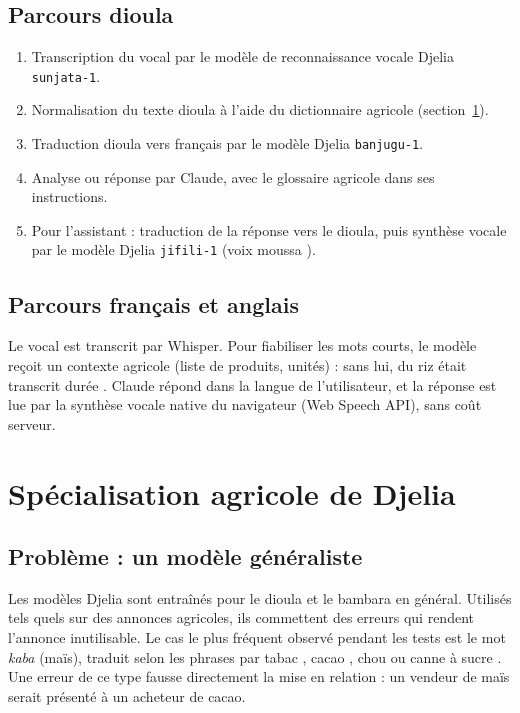 \documentclass[12pt,a4paper]{article}
\begin{document}
\subsection{Parcours dioula}

\begin{enumerate}
  \item Transcription du vocal par le modèle de reconnaissance vocale Djelia \texttt{sunjata-1}.
  \item Normalisation du texte dioula à l'aide du dictionnaire agricole (section~\ref{sec:dico}).
  \item Traduction dioula vers français par le modèle Djelia \texttt{banjugu-1}.
  \item Analyse ou réponse par Claude, avec le glossaire agricole dans ses instructions.
  \item Pour l'assistant : traduction de la réponse vers le dioula, puis synthèse vocale par le
  modèle Djelia \texttt{jifili-1} (voix \og moussa \fg{}).
\end{enumerate}

\subsection{Parcours français et anglais}

Le vocal est transcrit par Whisper. Pour fiabiliser les mots courts, le modèle reçoit un contexte
agricole (liste de produits, unités) : sans lui, \og du riz \fg{} était transcrit \og durée \fg{}.
Claude répond dans la langue de l'utilisateur, et la réponse est lue par la synthèse vocale native
du navigateur (Web Speech API), sans coût serveur.

\section{Spécialisation agricole de Djelia}
\label{sec:dico}

\subsection{Problème : un modèle généraliste}

Les modèles Djelia sont entraînés pour le dioula et le bambara en général. Utilisés tels quels sur
des annonces agricoles, ils commettent des erreurs qui rendent l'annonce inutilisable. Le cas le plus
fréquent observé pendant les tests est le mot \textit{kaba} (maïs), traduit selon les phrases par
\og tabac \fg{}, \og cacao \fg{}, \og chou \fg{} ou \og canne à sucre \fg{}. Une erreur de ce type
fausse directement la mise en relation : un vendeur de maïs serait présenté à un acheteur de cacao.
\end{document}
